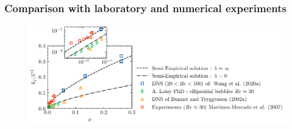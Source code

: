 \documentclass{sintefbeamer}
\begin{document}
\begin{frame}
  \frametitle{Comparison with laboratory and numerical experiments }

  \begin{figure}
    \centering
    \includegraphics[height = 0.35\textwidth]{image/HOMOGENEOUS_final/CA/KFliterature_diapo.pdf}
\end{figure}
\end{frame}
\end{document}
